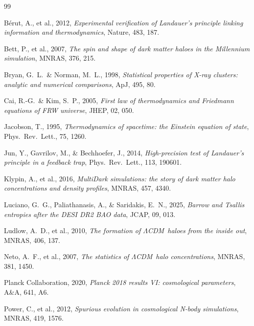 \documentclass[12pt]{article}
\newcommand{\LCDM}{$\Lambda$CDM}
\begin{document}

\begin{thebibliography}{99}

B\'{e}rut, A., et al., 2012,
\textit{Experimental verification of Landauer's principle linking information and thermodynamics},
Nature, 483, 187.

Bett, P., et al., 2007,
\textit{The spin and shape of dark matter haloes in the Millennium simulation},
MNRAS, 376, 215.

Bryan, G.~L.\ \& Norman, M.~L., 1998,
\textit{Statistical properties of X-ray clusters: analytic and numerical comparisons},
ApJ, 495, 80.

Cai, R.-G.\ \& Kim, S.~P., 2005,
\textit{First law of thermodynamics and Friedmann equations of FRW universe},
JHEP, 02, 050.

Jacobson, T., 1995,
\textit{Thermodynamics of spacetime: the Einstein equation of state},
Phys.\ Rev.\ Lett., 75, 1260.

Jun, Y., Gavrilov, M., \& Bechhoefer, J., 2014,
\textit{High-precision test of Landauer's principle in a feedback trap},
Phys.\ Rev.\ Lett., 113, 190601.

Klypin, A., et al., 2016,
\textit{MultiDark simulations: the story of dark matter halo concentrations and density profiles},
MNRAS, 457, 4340.

Luciano, G.~G., Paliathanasis, A., \& Saridakis, E.~N., 2025,
\textit{Barrow and Tsallis entropies after the DESI DR2 BAO data},
JCAP, 09, 013.

Ludlow, A.~D., et al., 2010,
\textit{The formation of \LCDM\ haloes from the inside out},
MNRAS, 406, 137.

Neto, A.~F., et al., 2007,
\textit{The statistics of \LCDM\ halo concentrations},
MNRAS, 381, 1450.

Planck Collaboration, 2020,
\textit{Planck 2018 results VI: cosmological parameters},
A\&A, 641, A6.

Power, C., et al., 2012,
\textit{Spurious evolution in cosmological N-body simulations},
MNRAS, 419, 1576.


\end{thebibliography}
\end{document}
